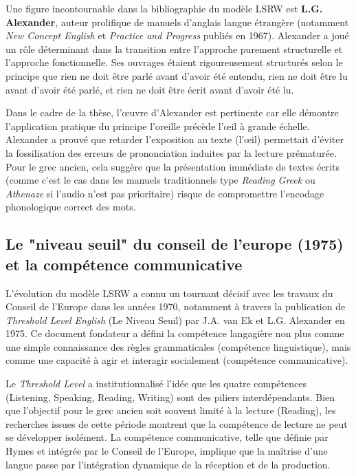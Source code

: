 Une figure incontournable dans la bibliographie du modèle LSRW est \textbf{L.G. Alexander}, auteur
prolifique de manuels d'anglais langue étrangère (notamment \textit{New Concept English} et
\textit{Practice and Progress} publiés en 1967).\cite{III-2-1-ref10} Alexander a joué un rôle
déterminant dans la transition entre l'approche purement structurelle et l'approche fonctionnelle.
Ses ouvrages étaient rigoureusement structurés selon le principe que \og rien ne doit être parlé
avant d'avoir été entendu, rien ne doit être lu avant d'avoir été parlé, et rien ne doit être écrit
avant d'avoir été lu\fg{}.\cite{III-2-1-ref12}

Dans le cadre de la thèse, l'œuvre d'Alexander est pertinente car elle démontre l'application
pratique du principe \og l'oreille précède l'œil\fg{} à grande échelle. Alexander a prouvé que
retarder l'exposition au texte (l'œil) permettait d'éviter la fossilisation des erreurs de
prononciation induites par la lecture prématurée. Pour le grec ancien, cela suggère que la
présentation immédiate de textes écrits (comme c'est le cas dans les manuels traditionnels type
\textit{Reading Greek} ou \textit{Athenaze} si l'audio n'est pas prioritaire) risque de compromettre
l'encodage phonologique correct des mots.\cite{III-2-1-ref11}



\subsection{Le "niveau seuil" du conseil de l'europe (1975) et la compétence communicative}

L'évolution du modèle LSRW a connu un tournant décisif avec les travaux du Conseil de l'Europe dans
les années 1970, notamment à travers la publication de \textit{Threshold Level English} (Le Niveau
Seuil) par J.A. van Ek et L.G. Alexander en 1975.\cite{III-2-1-ref15} Ce document fondateur a défini
la compétence langagière non plus comme une simple connaissance des règles grammaticales (compétence
linguistique), mais comme une capacité à agir et interagir socialement (compétence
communicative).\cite{III-2-1-ref17}

Le \textit{Threshold Level} a institutionnalisé l'idée que les quatre compétences (Listening,
Speaking, Reading, Writing) sont des piliers interdépendants. Bien que l'objectif pour le grec
ancien soit souvent limité à la lecture (Reading), les recherches issues de cette période montrent
que la compétence de lecture ne peut se développer isolément. La compétence communicative, telle que
définie par Hymes et intégrée par le Conseil de l'Europe, implique que la maîtrise d'une langue
passe par l'intégration dynamique de la réception et de la production.\cite{III-2-1-ref18}


